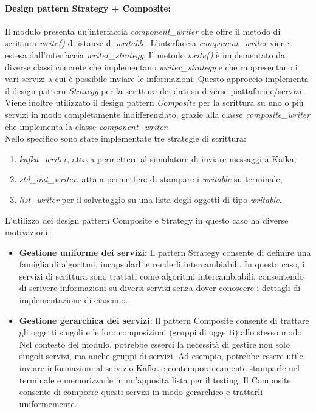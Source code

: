 \paragraph{Design pattern Strategy + Composite:}
Il modulo presenta un'interfaccia \textit{component\_writer} che offre il metodo di scrittura \textit{write()} di istanze di \textit{writable}.
L'interfaccia \textit{component\_writer} viene estesa dall'interfaccia \textit{writer\_strategy}.
Il metodo \textit{write()} è implementato da diverse classi concrete che implementano \textit{writer\_strategy} e che rappresentano i vari servizi a cui è possibile inviare le informazioni.
Questo approccio implementa il design pattern \textit{Strategy} per la scrittura dei dati su diverse piattaforme/servizi. Viene inoltre utilizzato il design pattern \textit{Composite} per la scrittura su uno o più servizi in modo completamente indifferenziato, grazie alla classe \textit{composite\_writer} che implementa la classe \textit{component\_writer}. \\
Nello specifico sono state implementate tre strategie di scrittura: 
\begin{enumerate}
    \item \textit{kafka\_writer}, atta a permettere al simulatore di inviare messaggi a Kafka;
    \item \textit{std\_out\_writer}, atta a permettere di stampare i \textit{writable} su terminale;
    \item \textit{list\_writer} per il salvataggio su una lista degli oggetti di tipo \textit{writable}.
\end{enumerate}
L'utilizzo dei design pattern Composite e Strategy in questo caso ha diverse motivazioni:
\begin{itemize}
    \item \textbf{Gestione uniforme dei servizi}: Il pattern Strategy consente di definire una famiglia di algoritmi, incapsularli e renderli intercambiabili. In questo caso, i servizi di scrittura sono trattati come algoritmi intercambiabili, consentendo di scrivere informazioni su diversi servizi senza dover conoscere i dettagli di implementazione di ciascuno.
    \item \textbf{Gestione gerarchica dei servizi}: Il pattern Composite consente di trattare gli oggetti singoli e le loro composizioni (gruppi di oggetti) allo stesso modo. \\
    Nel contesto del modulo, potrebbe esserci la necessità di gestire non solo singoli servizi, ma anche gruppi di servizi. Ad esempio, potrebbe essere utile inviare informazioni al servizio Kafka e contemporaneamente stamparle nel terminale e memorizzarle in un'apposita lista per il testing. Il Composite consente di comporre questi servizi in modo gerarchico e trattarli uniformemente.
\end{itemize}

